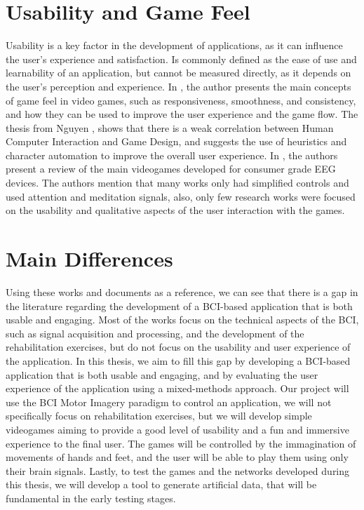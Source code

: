 \section{Usability and Game Feel}
Usability is a key factor in the development of applications, as it can influence the user's experience and satisfaction.
Is commonly defined as the ease of use and learnability of an application, but cannot be measured directly, as it depends on the user's perception and experience.
In \cite{swink2008game}, the author presents the main concepts of game feel in video games, such as responsiveness, smoothness, and consistency, and how they can be used to improve the user experience and the game flow.
The thesis from Nguyen \cite{nguyen2012human}, shows that there is a weak correlation between Human Computer Interaction and Game Design, and suggests the use of heuristics and character automation to improve the overall user experience.
In \cite{doi:10.1080/10447318.2019.1612213}, the authors present a review of the main videogames developed for consumer grade EEG devices.
The authors mention that many works only had simplified controls and used attention and meditation signals, also, only few research works were focused on the usability and qualitative aspects of the user interaction with the games.

\section{Main Differences}
Using these works and documents as a reference, we can see that there is a gap in the literature regarding the development of a BCI-based application that is both usable and engaging.
Most of the works focus on the technical aspects of the BCI, such as signal acquisition and processing, and the development of the rehabilitation exercises, but do not focus on the usability and user experience of the application.
In this thesis, we aim to fill this gap by developing a BCI-based application that is both usable and engaging, and by evaluating the user experience of the application using a mixed-methods approach.
Our project will use the BCI Motor Imagery paradigm to control an application, we will not specifically focus on rehabilitation exercises, but we will develop simple videogames aiming to provide a good level of usability and a fun and immersive experience to the final user.
The games will be controlled by the immagination of movements of hands and feet, and the user will be able to play them using only their brain signals.
Lastly, to test the games and the networks developed during this thesis, we will develop a tool to generate artificial data, that will be fundamental in the early testing stages.
